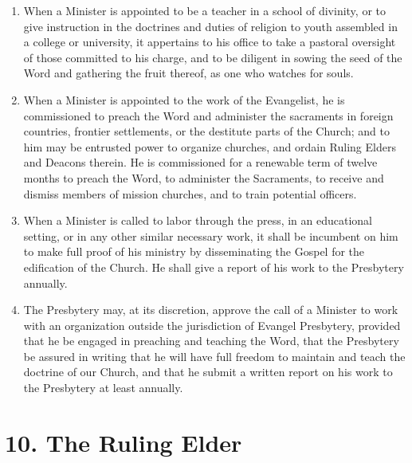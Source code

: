\documentclass[
]{book}
\begin{document}
\begin{enumerate}
\item
  When a Minister is appointed to be a teacher in a school of divinity, or to give instruction in the doctrines and duties of religion to youth assembled in a college or university, it appertains to his office to take a pastoral oversight of those committed to his charge, and to be diligent in sowing the seed of the Word and gathering the fruit thereof, as one who watches for souls.
\item
  \protect\hypertarget{9.6}{\href{}{}}When a Minister is appointed to the work of the Evangelist, he is commissioned to preach the Word and administer the sacraments in foreign countries, frontier settlements, or the destitute parts of the Church; and to him may be entrusted power to organize churches, and ordain Ruling Elders and Deacons therein. He is commissioned for a renewable term of twelve months to preach the Word, to administer the Sacraments, to receive and dismiss members of mission churches, and to train potential officers.
\item
  When a Minister is called to labor through the press, in an educational setting, or in any other similar necessary work, it shall be incumbent on him to make full proof of his ministry by disseminating the Gospel for the edification of the Church. He shall give a report of his work to the Presbytery annually.
\item
  The Presbytery may, at its discretion, approve the call of a Minister to work with an organization outside the jurisdiction of Evangel Presbytery, provided that he be engaged in preaching and teaching the Word, that the Presbytery be assured in writing that he will have full freedom to maintain and teach the doctrine of our Church, and that he submit a written report on his work to the Presbytery at least annually.
\end{enumerate}

\hypertarget{the-ruling-elder}{%
\section*{10. The Ruling Elder}\label{the-ruling-elder}}

\protect\hypertarget{chapter-slug-10-the-ruling-elder}{\href{}{}}
\end{document}
